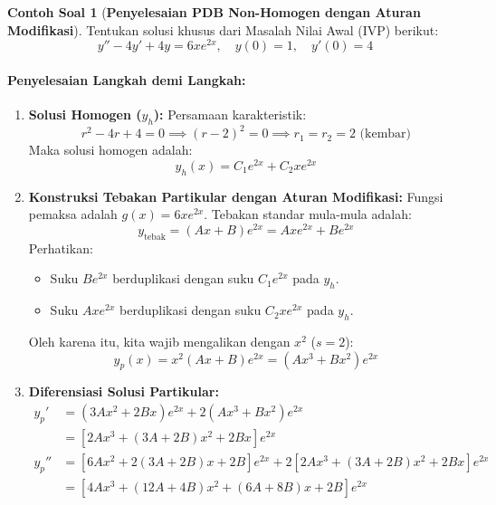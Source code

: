 \documentclass[11pt,a4paper]{article}
\theoremstyle{definition}
\newtheorem{example}{Contoh Soal}[section]
\begin{document}
\begin{example}[\textbf{Penyelesaian PDB Non-Homogen dengan Aturan Modifikasi}]
Tentukan solusi khusus dari Masalah Nilai Awal (IVP) berikut:
\begin{equation*}
    y'' - 4y' + 4y = 6x e^{2x}, \quad y(0) = 1, \quad y'(0) = 4
\end{equation*}

\paragraph{Penyelesaian Langkah demi Langkah:}
\begin{enumerate}[leftmargin=*]
    \item \textbf{Solusi Homogen ($y_h$):}
    Persamaan karakteristik:
    \begin{equation*}
        r^2 - 4r + 4 = 0 \implies (r - 2)^2 = 0 \implies r_1 = r_2 = 2\text{ (kembar)}
    \end{equation*}
    Maka solusi homogen adalah:
    \begin{equation*}
        y_h(x) = C_1 e^{2x} + C_2 x e^{2x}
    \end{equation*}

    \item \textbf{Konstruksi Tebakan Partikular dengan Aturan Modifikasi:}
    Fungsi pemaksa adalah $g(x) = 6x e^{2x}$. Tebakan standar mula-mula adalah:
    \begin{equation*}
        y_{\text{tebak}} = (A x + B) e^{2x} = A x e^{2x} + B e^{2x}
    \end{equation*}
    Perhatikan:
    \begin{itemize}
        \item Suku $B e^{2x}$ berduplikasi dengan suku $C_1 e^{2x}$ pada $y_h$.
        \item Suku $A x e^{2x}$ berduplikasi dengan suku $C_2 x e^{2x}$ pada $y_h$.
    \end{itemize}
    Oleh karena itu, kita wajib mengalikan dengan $x^2$ ($s = 2$):
    \begin{equation*}
        y_p(x) = x^2 (A x + B) e^{2x} = (A x^3 + B x^2) e^{2x}
    \end{equation*}

    \item \textbf{Diferensiasi Solusi Partikular:}
    \begin{align*}
        y_p' &= (3A x^2 + 2B x) e^{2x} + 2(A x^3 + B x^2) e^{2x} \\
             &= \left[ 2A x^3 + (3A + 2B) x^2 + 2B x \right] e^{2x} \\
        y_p'' &= \left[ 6A x^2 + 2(3A + 2B) x + 2B \right] e^{2x} + 2\left[ 2A x^3 + (3A + 2B) x^2 + 2B x \right] e^{2x} \\
              &= \left[ 4A x^3 + (12A + 4B) x^2 + (6A + 8B) x + 2B \right] e^{2x}
    \end{align*}


\end{enumerate}
\end{example}
\end{document}
